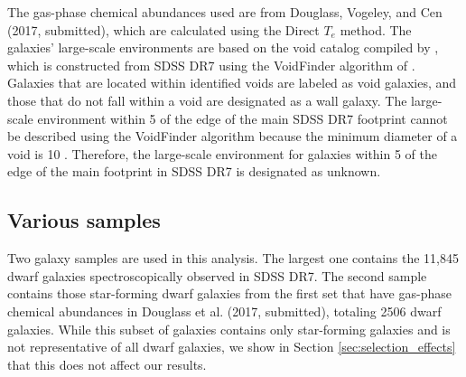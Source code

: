 The gas-phase chemical abundances used are from Douglass, Vogeley, and Cen 
(2017, submitted), which are calculated using the Direct $T_e$ method.  The 
galaxies' large-scale environments are based on the void catalog compiled by 
\cite{Pan12}, which is constructed from SDSS DR7 using the VoidFinder algorithm 
of \cite{Hoyle02}.  Galaxies that are located within identified voids are 
labeled as void galaxies, and those that do not fall within a void are 
designated as a wall galaxy.  The large-scale environment within 5 \hMpc of the 
edge of the main SDSS DR7 footprint cannot be described using the VoidFinder 
algorithm because the minimum diameter of a void is 10 \hMpc.  Therefore, the 
large-scale environment for galaxies within 5 \hMpc of the edge of the main 
footprint in SDSS DR7 is designated as unknown.



\subsection{Various samples}


Two galaxy samples are used in this analysis.  The largest one contains the 
11,845 dwarf galaxies spectroscopically observed in SDSS DR7.  The second sample 
contains those star-forming dwarf galaxies from the first set that have 
gas-phase chemical abundances in Douglass et al. (2017, submitted), totaling 2506 
dwarf galaxies.  While this subset of galaxies contains only star-forming 
galaxies and is not representative of all dwarf galaxies, we show in Section 
\ref{sec:selection_effects} that this does not affect our results.


